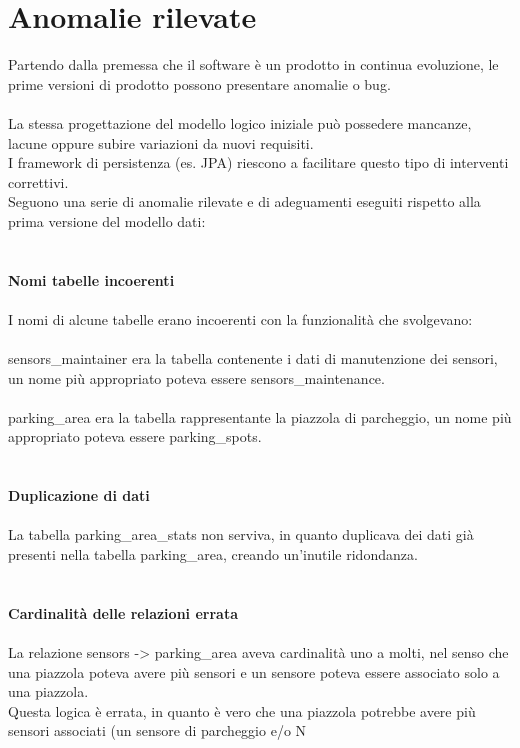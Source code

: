 \section{Anomalie rilevate}
Partendo dalla premessa che il software è un prodotto in continua evoluzione, le prime versioni
di prodotto possono presentare anomalie o bug.
\\\\
La stessa progettazione del modello logico iniziale può possedere mancanze, lacune oppure subire variazioni da nuovi requisiti. 
\\
I framework di persistenza (es. JPA) 
riescono a facilitare questo tipo di interventi correttivi.
\\
Seguono una serie di anomalie rilevate e di adeguamenti eseguiti rispetto alla prima versione del modello dati:
\\\\\\
\textbf{Nomi tabelle incoerenti}
\\\\
I nomi di alcune tabelle erano incoerenti con la funzionalità che svolgevano:
\\\\
sensors\_maintainer era la tabella contenente i dati di manutenzione dei sensori, un 
nome più appropriato poteva essere sensors\_maintenance.
\\\\
parking\_area era la tabella rappresentante la piazzola di parcheggio, un nome più appropriato
poteva essere parking\_spots.
\\\\\\
\clearpage
\leavevmode\newline
\textbf{Duplicazione di dati}
\\\\
La tabella parking\_area\_stats non serviva, in quanto duplicava dei dati già presenti
nella tabella parking\_area, creando un'inutile ridondanza.
\\\\\\
\textbf{Cardinalità delle relazioni errata}
\\\\
La relazione sensors -> parking\_area aveva cardinalità uno a molti, nel senso che una piazzola poteva avere
più sensori e un sensore poteva essere associato solo a una piazzola. 
\\
Questa logica è errata, in quanto è vero che una piazzola potrebbe avere più sensori associati (un sensore di parcheggio e/o N
